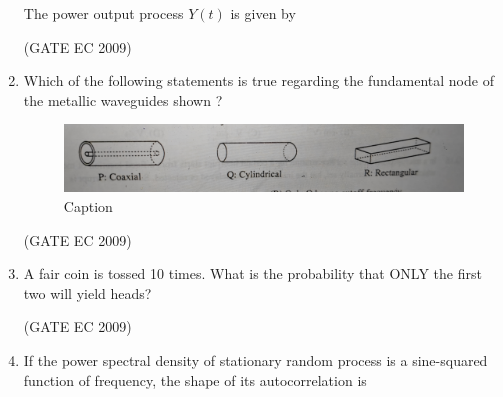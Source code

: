 \documentclass[journal,12pt,onecolumn]{IEEEtran}
\theoremstyle{remark}
\begin{document}
\begin{enumerate}[start=1, label={Q\arabic*.}]
The power output process $Y(t)$ is given by 

\begin{enumerate}[label=(\Alph*)]
\end{enumerate}
\hfill (GATE EC 2009)

\item Which of the following statements is true regarding the fundamental node of the metallic waveguides shown ?
\begin{figure}[H]
    \centering
    \includegraphics[width=0.5\linewidth]{images/img_4.jpg}
    \caption{Caption}
    \label{fig:placeholder}
\end{figure}
\begin{enumerate}[label=(\Alph*)]
\end{enumerate}
\hfill (GATE EC 2009)

\item A fair coin is tossed 10 times. What is the probability that ONLY the first two will yield heads?

\begin{enumerate}[label=(\Alph*)]
\end{enumerate}
\hfill (GATE EC 2009)

\item If the power spectral density of stationary random process is a sine-squared function of frequency, the shape of its autocorrelation is


\end{enumerate}
\end{document}
